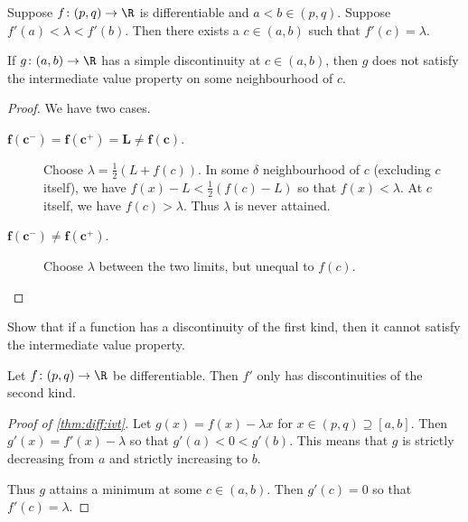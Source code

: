 \begin{theorem} \label{thm:diff:ivt}
    Suppose $f\colon (p, q) \to \R$ is differentiable and
    $a < b \in (p, q)$.
    Suppose $f'(a) < \lambda < f'(b)$.
    Then there exists a $c \in (a, b)$ such that $f'(c) = \lambda$.
\end{theorem}

\begin{exercise}
    If $g\colon (a, b) \to \R$ has a simple discontinuity at $c \in (a, b)$,
    then $g$ does not satisfy the intermediate value property on some
    neighbourhood of $c$.
\end{exercise}
\begin{proof}
    We have two cases.
    \begin{description}
        \item[$\bm{f(c^-) = f(c^+) = L \ne f(c)}$.]
        Choose $\lambda = \frac12 (L + f(c))$.
        In some $\delta$ neighbourhood of $c$ (excluding $c$ itself),
        we have $f(x) - L < \frac12 (f(c) - L)$ so that
        $f(x) < \lambda$.
        At $c$ itself, we have $f(c) > \lambda$.
        Thus $\lambda$ is never attained.
        \item[$\bm{f(c^-) \ne f(c^+)}$.]
        Choose $\lambda$ between the two limits, but unequal to $f(c)$.
        \qedhere
    \end{description}
\end{proof}

\begin{exercise}
    Show that if a function has a discontinuity of the first kind, then
    it cannot satisfy the intermediate value property.
\end{exercise}
\begin{corollary}
    Let $f\colon (p, q) \to \R$ be differentiable.
    Then $f'$ only has discontinuities of the second kind.
\end{corollary}

\begin{proof}[Proof of \cref{thm:diff:ivt}]
    Let $g(x) = f(x) - \lambda x$ for $x \in (p, q) \supseteq [a, b]$.
    Then $g'(x) = f'(x) - \lambda$ so that $g'(a) < 0 < g'(b)$.
    This means that $g$ is strictly decreasing from $a$
    and strictly increasing to $b$.

    Thus $g$ attains a minimum at some $c \in (a, b)$.
    Then $g'(c) = 0$ so that $f'(c) = \lambda$.
\end{proof}

